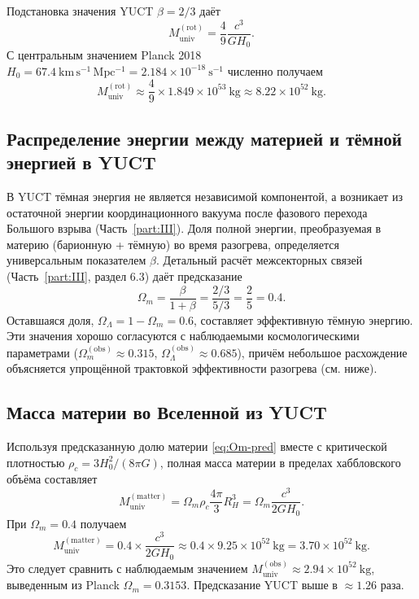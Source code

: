 \documentclass[11pt,a4paper]{article}
\begin{document}
	Подстановка значения YUCT \(\beta = 2/3\) даёт
	\begin{equation}
		M_{\mathrm{univ}}^{\mathrm{(rot)}} = \frac{4}{9} \frac{c^3}{G H_0}.
		\label{eq:muniv-rot-beta}
	\end{equation}
	С центральным значением Planck 2018 \(H_0 = 67.4\ \mathrm{km\,s^{-1}\,Mpc^{-1}} = 2.184\times 10^{-18}\ \mathrm{s^{-1}}\) численно получаем
	\[
	M_{\mathrm{univ}}^{\mathrm{(rot)}} \approx \frac{4}{9} \times 1.849\times 10^{53}\ \mathrm{kg} \approx 8.22\times 10^{52}\ \mathrm{kg}.
	\]
	
	\subsection{Распределение энергии между материей и тёмной энергией в YUCT}
	
	В YUCT тёмная энергия не является независимой компонентой, а возникает из остаточной энергии координационного вакуума после фазового перехода Большого взрыва (Часть~\ref{part:III}). Доля полной энергии, преобразуемая в материю (барионную + тёмную) во время разогрева, определяется универсальным показателем \(\beta\). Детальный расчёт межсекторных связей (Часть~\ref{part:III}, раздел 6.3) даёт предсказание
	\begin{equation}
		\Omega_m = \frac{\beta}{1+\beta} = \frac{2/3}{5/3} = \frac{2}{5} = 0.4.
		\label{eq:Om-pred}
	\end{equation}
	Оставшаяся доля, \(\Omega_\Lambda = 1 - \Omega_m = 0.6\), составляет эффективную тёмную энергию. Эти значения хорошо согласуются с наблюдаемыми космологическими параметрами (\(\Omega_m^{\mathrm{(obs)}} \approx 0.315\), \(\Omega_\Lambda^{\mathrm{(obs)}} \approx 0.685\)), причём небольшое расхождение объясняется упрощённой трактовкой эффективности разогрева (см. ниже).
	
	\subsection{Масса материи во Вселенной из YUCT}
	
	Используя предсказанную долю материи \eqref{eq:Om-pred} вместе с критической плотностью \(\rho_c = 3H_0^2/(8\pi G)\), полная масса материи в пределах хаббловского объёма составляет
	\begin{equation}
		M_{\mathrm{univ}}^{\mathrm{(matter)}} = \Omega_m \rho_c \frac{4\pi}{3} R_H^3 = \Omega_m \frac{c^3}{2 G H_0}.
		\label{eq:muniv-matter}
	\end{equation}
	При \(\Omega_m = 0.4\) получаем
	\[
	M_{\mathrm{univ}}^{\mathrm{(matter)}} = 0.4 \times \frac{c^3}{2 G H_0} \approx 0.4 \times 9.25\times 10^{52}\ \mathrm{kg} = 3.70\times 10^{52}\ \mathrm{kg}.
	\]
	Это следует сравнить с наблюдаемым значением \(M_{\mathrm{univ}}^{\mathrm{(obs)}} \approx 2.94\times 10^{52}\ \mathrm{kg}\), выведенным из Planck \(\Omega_m = 0.3153\). Предсказание YUCT выше в \(\approx 1.26\) раза.
	
\end{document}
